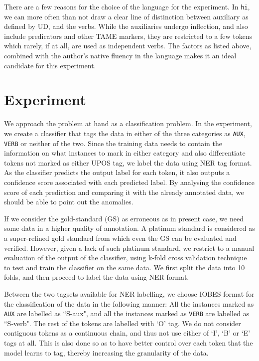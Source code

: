 There are a few reasons for the choice of the language for the experiment. In \verb|hi|, we can more often than not draw a clear line of distinction between auxiliary as defined by UD, and the verbs. While the auxiliaries undergo inflection, and also include predicators and other TAME markers, they are restricted to a few tokens which rarely, if at all, are used as independent verbs. The factors as listed above, combined with the author's native fluency in the language makes it an ideal candidate for this experiment.

\section{Experiment}
\label{ssec:auxverbExperiment}

We approach the problem at hand as a classification problem. In the experiment, we create a classifier that tags the data in either of the three categories as \verb|AUX|, \verb|VERB| or neither of the two. Since the training data needs to contain the information on what instances to mark in either category and also differentiate tokens not marked as either UPOS tag, we label the data using NER tag format. As the classifier predicts the output label for each token, it also outputs a confidence score associated with each predicted label. By analysing the confidence score of each prediction and comparing it with the already annotated data, we should be able to point out the anomalies.

If we consider the gold-standard (GS) as erroneous as in present case, we need some data in a higher quality of annotation. A platinum standard is considered as a super-refined gold standard from which even the GS can be evaluated and verified. However, given a lack of such platinum standard, we restrict to a manual evaluation of the output of the classifier, using k-fold cross validation technique to test and train the classifier on the same data. We first split the data into 10 folds, and then proceed to label the data using NER format.

Between the two tagsets available for NER labelling, we choose IOBES format for the classification of the data in the following manner: All the instances marked as \texttt{AUX} are labelled as ``S-aux", and all the instances marked as \texttt{VERB} are labelled as ``S-verb". The rest of the tokens are labelled with `O' tag. We do not consider contiguous tokens as a continuous chain, and thus not use either of `I', `B' or `E' tags at all. This is also done so as to have better control over each token that the model learns to tag, thereby increasing the granularity of the data.

